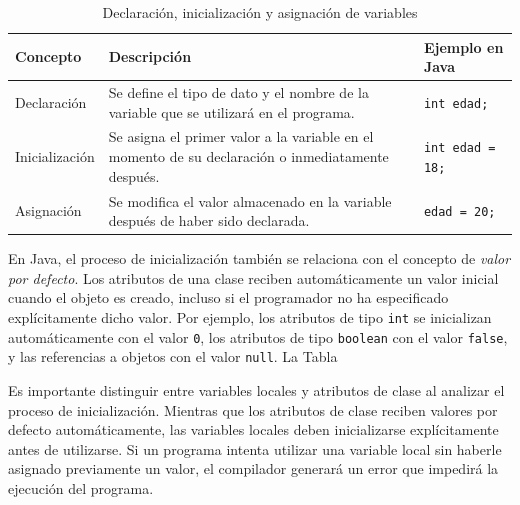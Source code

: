 \documentclass[12pt,twoside]{book}
\begin{document}
					\begin{table}[H]
						\centering
						\caption{Declaración, inicialización y asignación de variables}
						\label{tab:declaracionInicializacionAsignacion}
						\small
						\begin{tabularx}{\textwidth}{l X X}
							\toprule
							\textbf{Concepto} & \textbf{Descripción} & \textbf{Ejemplo en Java} \\
							\midrule
							Declaración & Se define el tipo de dato y el nombre de la variable que se utilizará en el programa. & \texttt{int edad;} \\
							
							Inicialización & Se asigna el primer valor a la variable en el momento de su declaración o inmediatamente después. & \texttt{int edad = 18;} \\
							
							Asignación & Se modifica el valor almacenado en la variable después de haber sido declarada. & \texttt{edad = 20;} \\
							
							\bottomrule
						\end{tabularx}
					\end{table}
					
					\noindent
					En Java, el proceso de inicialización también se relaciona con el concepto de \textit{valor por defecto}. Los atributos de una clase reciben automáticamente un valor inicial cuando el objeto es creado, incluso si el programador no ha especificado explícitamente dicho valor. Por ejemplo, los atributos de tipo \texttt{int} se inicializan automáticamente con el valor \texttt{0}, los atributos de tipo \texttt{boolean} con el valor \texttt{false}, y las referencias a objetos con el valor \texttt{null}. La Tabla %
					
					Es importante distinguir entre variables locales y atributos de clase al analizar el proceso de inicialización. Mientras que los atributos de clase reciben valores por defecto automáticamente, las variables locales deben inicializarse explícitamente antes de utilizarse. Si un programa intenta utilizar una variable local sin haberle asignado previamente un valor, el compilador generará un error que impedirá la ejecución del programa.
					
\end{document}
